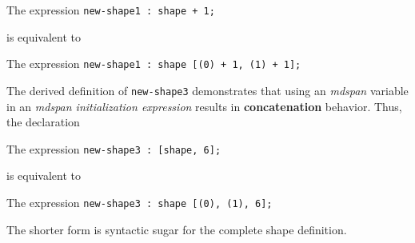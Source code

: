 The expression \texttt{new-\allowbreak{}shape1 :\allowbreak{} shape + 1;}

is equivalent to

The expression \texttt{new-\allowbreak{}shape1 :\allowbreak{} shape [(0) + 1, (1) + 1];}

The derived definition of \texttt{new-shape3} demonstrates that using an \emph{mdspan} variable in an \emph{mdspan initialization expression} results in \textbf{concatenation} behavior. Thus, the declaration

The expression \texttt{new-\allowbreak{}shape3 :\allowbreak{} [shape, 6];}

is equivalent to

The expression \texttt{new-\allowbreak{}shape3 :\allowbreak{} shape [(0), (1), 6];}

The shorter form is syntactic sugar for the complete shape definition.
